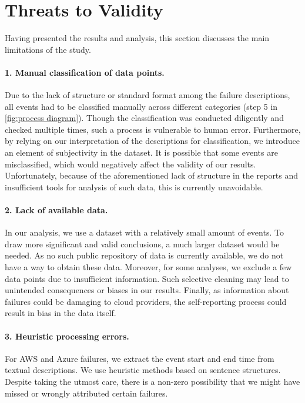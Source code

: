\section{Threats to Validity}\label{sec:threats to validity}
Having presented the results and analysis, this section discusses the main limitations of the study.

\paragraph{1. Manual classification of data points.}
Due to the lack of structure or standard format among the failure descriptions, all events had to be classified manually across different categories (step 5 in \autoref{fig:process diagram}).
Though the classification was conducted diligently and checked multiple times, such a process is vulnerable to human error.
Furthermore, by relying on our interpretation of the descriptions for classification, we introduce an element of subjectivity in the dataset.
It is possible that some events are misclassified, which would negatively affect the validity of our results.
Unfortunately, because of the aforementioned lack of structure in the reports and insufficient tools for analysis of such data, this is currently unavoidable.

\paragraph{2. Lack of available data.}
In our analysis, we use a dataset with a relatively small amount of events.
To draw more significant and valid conclusions, a much larger dataset would be needed.
As no such public repository of data is currently available, we do not have a way to obtain these data.
Moreover, for some analyses, we exclude a few data points due to insufficient information.
Such selective cleaning may lead to unintended consequences or biases in our results.
Finally, as information about failures could be damaging to cloud providers, the self-reporting process could result in bias in the data itself.

\paragraph{3. Heuristic processing errors.}
For AWS and Azure failures, we extract the event start and end time from textual descriptions.
We use heuristic methods based on sentence structures.
Despite taking the utmost care, there is a non-zero possibility that we might have missed or wrongly attributed certain failures.
